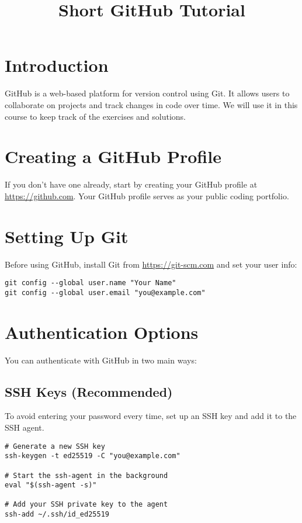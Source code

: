 \documentclass[11pt]{article}
\title{Short GitHub Tutorial}
\author{}
\date{}
\begin{document}
\maketitle

\section{Introduction}
GitHub is a web-based platform for version control using Git. It allows users to collaborate on projects and track changes in code over time. We will use it in this course to keep track of the exercises and solutions.

\section{Creating a GitHub Profile}
If you don't have one already, start by creating your GitHub profile at \url{https://github.com}. Your GitHub profile serves as your public coding portfolio.

\section{Setting Up Git}
Before using GitHub, install Git from \url{https://git-scm.com} and set your user info:

\begin{lstlisting}
git config --global user.name "Your Name"
git config --global user.email "you@example.com"
\end{lstlisting}

\section{Authentication Options}
You can authenticate with GitHub in two main ways:

\subsection{SSH Keys (Recommended)}
To avoid entering your password every time, set up an SSH key and add it to the SSH agent.

\begin{lstlisting}
# Generate a new SSH key
ssh-keygen -t ed25519 -C "you@example.com"

# Start the ssh-agent in the background
eval "$(ssh-agent -s)"

# Add your SSH private key to the agent
ssh-add ~/.ssh/id_ed25519
\end{lstlisting}
\end{document}
